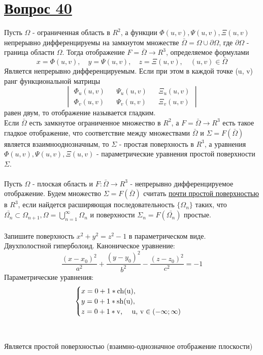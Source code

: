 \documentclass{report}
\begin{document}
\section{\underline{Вопрос 40}}
Пусть $\Omega$ - ограниченная область в $R^2$, а функции $\Phi(u, v), \Psi(u, v), \Xi(u, v)$ непрерывно дифференцируемы на замкнутом множестве $\bar{\Omega} = \Omega \cup \partial\Omega$, где $\partial\Omega$ - граница области $\Omega$. Тогда отображение $F = \bar{\Omega} \to R^3$, определяемое формулами 
\[
x = \Phi(u, v), \quad y = \Psi(u, v), \quad z = \Xi(u, v), \quad (u, v) \in \bar{\Omega}
\]
Является непрерывно дифференцируемым. Если при этом в каждой точке (u, v) ранг функциональной матрицы
\[
\begin{vmatrix} \Phi_u(u, v) && \Psi_u(u, v) && \Xi_u(u, v) \\ \Phi_v(u, v) && \Psi_v(u, v) && \Xi_v(u, v) \end{vmatrix}
\]
равен двум, то отображение называется гладким. \\
Если $\bar{\Omega}$ есть замкнутое ограниченное множество в $R^2$, а $F = \bar{\Omega} \to R^3$
есть такое гладкое отображение, что соответствие между множествами $\bar{\Omega}$ и
$\Sigma = F(\bar{\Omega})$ является взаимнооднозначным, то $\Sigma$ - простая поверхность в $R^3$,
а уравнения $\Phi(u, v), \Psi(u, v), \Xi(u, v)$ - параметрические уравнения простой поверхности $\Sigma$. \\ \\
Пусть $\Omega$ - плоская область и $F: \bar{\Omega} \to R^3$ - непрерывно дифференцируемое отображение. Будем
множество $\Sigma = F(\bar{\Omega})$ считать \underline{почти простой поверхностью} в $R^3$, если найдется
расширяющая последовательность $\{\Omega_n\}$ таких, что
$\bar{\Omega_n} \subset \Omega_{n+1}, \Omega = \bigcup_{n=1}^\infty \Omega_n$ и поверхности $\Sigma_n =
F(\bar{\Omega_n})$ простые. \\ \\
Запишите поверхность $x^2 + y^2 = z^2 - 1$ в параметрическом виде. \\
Двухполостной гиперболоид. Каноническое уравнение: 
\[
\frac{(x-x_0)^2}{a^2} + \frac{(y-y_0)^2}{b^2} - \frac{(z-z_0)^2}{c^2} = - 1
\]
Параметрические уравнения:
\[
 \begin{cases}
  x = 0 + 1*\text{ch(u)}, \\
  y = 0 + 1*\text{sh(u)}, \\
  z = 0 + 1*\text{v, \quad u, v} \in (-\infty; \infty)
 \end{cases}
\] 
\\ \\
Является простой поверхностью (взаимно-однозначное отображение плоскости)
\newpage
\end{document}
